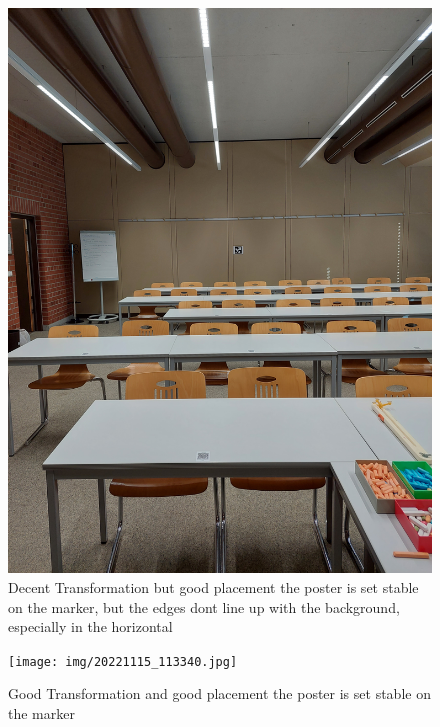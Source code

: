 \documentclass[a4paper,twocolumn]{article}
\begin{document}
    
    \begin{figure}[h!]
    \centering
    \includegraphics[width=0.9\columnwidth]{img/20221115_113328.jpg} %
    \caption{Decent Transformation but good placement the poster is set stable on the marker, but the edges dont line up with the background, especially in the horizontal}
    \label{fig:20221115_113328.jpg}
    \end{figure}
    
    \begin{figure}[h!]
    \centering
    \texttt{[image: img/20221115\_113340.jpg]} %
    \caption{Good Transformation and good placement the poster is set stable on the marker}
    \label{fig:20221115_113340.jpg}
    \end{figure}
    
\end{document}
